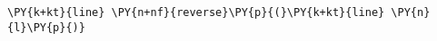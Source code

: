 \begin{Verbatim}[commandchars=\\\{\}]
    \PY{k+kt}{line} \PY{n+nf}{reverse}\PY{p}{(}\PY{k+kt}{line} \PY{n}{l}\PY{p}{)}
\end{Verbatim}
